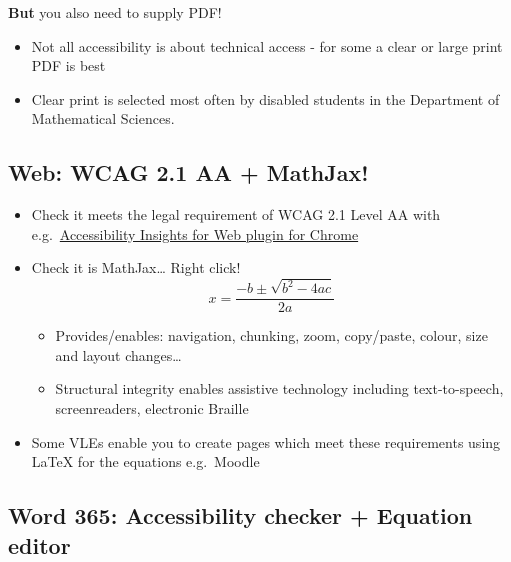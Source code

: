 \documentclass[
  10pt,
  english,
  a4paper]{article}
\providecommand{\tightlist}{%
  \setlength{\itemsep}{0pt}\setlength{\parskip}{0pt}}
\theoremstyle{plain}
\theoremstyle{plain}
\theoremstyle{plain}
\theoremstyle{plain}
\theoremstyle{plain}
\theoremstyle{definition}
\theoremstyle{definition}
\theoremstyle{definition}
\theoremstyle{remark}
\begin{document}
\textbf{But} you also need to supply PDF!

\begin{itemize}
\tightlist
\item
  Not all accessibility is about technical access - for some a clear or large print PDF is best
\item
  Clear print is selected most often by disabled students in the Department of Mathematical Sciences.
\end{itemize}

\hypertarget{web-wcag-2.1-aa-mathjax}{%
\subsection{Web: WCAG 2.1 AA + MathJax!}\label{web-wcag-2.1-aa-mathjax}}

\begin{itemize}
\item
  Check it meets the legal requirement of WCAG 2.1 Level AA with e.g.~\href{https://accessibilityinsights.io/docs/en/web/overview}{Accessibility Insights for Web plugin for Chrome}
\item
  Check it is MathJax\ldots{} Right click!
  \[x = \frac{-b\pm\sqrt{b^2 - 4ac}}{2a}\]

  \begin{itemize}
  \tightlist
  \item
    Provides/enables: navigation, chunking, zoom, copy/paste, colour, size and layout changes\ldots{}
  \item
    Structural integrity enables assistive technology including text-to-speech, screenreaders, electronic Braille
  \end{itemize}
\item
  Some VLEs enable you to create pages which meet these requirements using LaTeX for the equations e.g.~Moodle
\end{itemize}

\hypertarget{word-365-accessibility-checker-equation-editor}{%
\subsection{Word 365: Accessibility checker + Equation editor}\label{word-365-accessibility-checker-equation-editor}}
\end{document}
